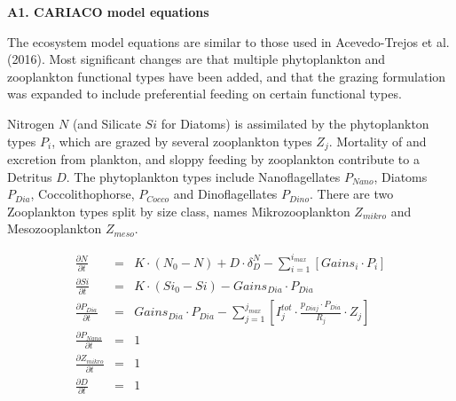 \documentclass[11pt,letterpaper,english]{article}
\begin{document}
\newcommand{\etal}{{\em et al.}}
\newcommand{\ux}{{\underline{x}}}
\newcommand{\tdt}{{t}} 

{\bf {\large A1. CARIACO model equations}}

The ecosystem model equations are similar to those used in Acevedo-Trejos et al. (2016).
Most significant changes are that multiple phytoplankton and zooplankton functional types have been added, and that the grazing formulation was expanded to include preferential feeding on certain functional types.

Nitrogen $N$ (and Silicate $Si$ for Diatoms) is assimilated by the phytoplankton types $P_i$, which are grazed by several zooplankton types $Z_j$. Mortality of and excretion from plankton, and sloppy feeding by zooplankton contribute to a Detritus $D$. The phytoplankton types include Nanoflagellates $P_{Nano}$, Diatoms $P_{Dia}$, Coccolithophorse, $P_{Cocco}$ and Dinoflagellates $P_{Dino}$. There are two Zooplankton types split by size class, names Mikrozooplankton $Z_{mikro}$ and Mesozooplankton $Z_{meso}$.

\begin{eqnarray}
\frac{\partial N}{\partial t} & = & 
K \cdot \left(N_{0} - N\right) + D \cdot \delta^{N}_{D} -\sum_{i=1}^{i_{max}} [Gains_{i} \cdot P_{i}] 
\nonumber  \\
\frac{\partial Si}{\partial t} & = & 
K \cdot \left(Si_{0} - Si\right) - Gains_{Dia} \cdot P_{Dia}
\nonumber \\
\frac{\partial P_{Dia}}{\partial t} & = & 
Gains_{Dia} \cdot P_{Dia} - \sum_{j=1}^{j_{max}} [I^{tot}_j⋅\frac{p_{Dia j}⋅P_{Dia}}{R_{j}}⋅Z_{j}]
\nonumber \\
\frac{\partial P_{Nano}}{\partial t} & = & 
1
\nonumber \\
\frac{\partial Z_{mikro}}{\partial t} & = & 
1
\nonumber \\
\frac{\partial D}{\partial t} & = & 
1
\nonumber
\end{eqnarray}
\end{document}
